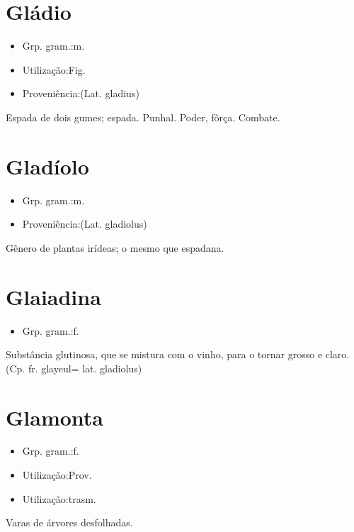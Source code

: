 \section{Gládio}
\begin{itemize}
\item {Grp. gram.:m.}
\end{itemize}
\begin{itemize}
\item {Utilização:Fig.}
\end{itemize}
\begin{itemize}
\item {Proveniência:(Lat. \textunderscore gladius\textunderscore )}
\end{itemize}
Espada de dois gumes; espada.
Punhal.
Poder, fôrça.
Combate.
\section{Gladíolo}
\begin{itemize}
\item {Grp. gram.:m.}
\end{itemize}
\begin{itemize}
\item {Proveniência:(Lat. \textunderscore gladiolus\textunderscore )}
\end{itemize}
Gênero de plantas irídeas; o mesmo que \textunderscore espadana\textunderscore .
\section{Glaiadina}
\begin{itemize}
\item {Grp. gram.:f.}
\end{itemize}
Substância glutinosa, que se mistura com o vinho, para o tornar grosso e claro.
(Cp. fr. \textunderscore glayeul\textunderscore  = lat. \textunderscore gladiolus\textunderscore )
\section{Glamonta}
\begin{itemize}
\item {Grp. gram.:f.}
\end{itemize}
\begin{itemize}
\item {Utilização:Prov.}
\end{itemize}
\begin{itemize}
\item {Utilização:trasm.}
\end{itemize}
Varas de árvores desfolhadas.
